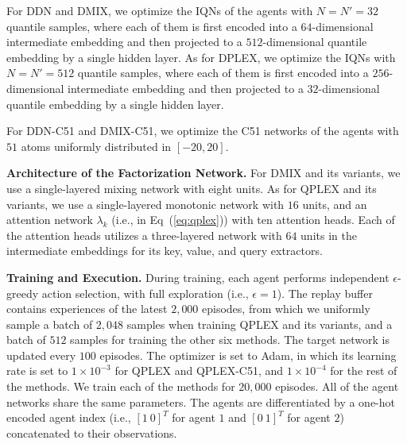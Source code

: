 \documentclass[twoside,11pt]{article}
\newcommand{\agentcounter}{k}
\newcommand{\numberofquantiles}{N}
\newcommand{\numberofquantilesamples}{N'}
\newcommand{\dmix}{DMIX}
\begin{document}
For DDN and DMIX, we optimize the IQNs of the agents with $\numberofquantiles{}=\numberofquantilesamples{}=32$ quantile samples, where each of them is first encoded into a $64$-dimensional intermediate embedding and then projected to a $512$-dimensional quantile embedding by a single hidden layer. As for DPLEX, we optimize the IQNs with $\numberofquantiles{}=\numberofquantilesamples{}=512$ quantile samples, where each of them is first encoded  into a $256$-dimensional intermediate embedding and then projected to a $32$-dimensional quantile embedding by a single hidden layer.

For DDN-C51 and DMIX-C51, we optimize the C51 networks of the agents with $51$ atoms uniformly distributed in $[-20,20]$.

\textbf{Architecture of the Factorization Network.}
For \dmix{} and its variants, we use a single-layered mixing network with eight units. As for QPLEX and its variants, we use a single-layered monotonic network with $16$ units, and an attention network $\lambda_\agentcounter{}$ (i.e., in Eq~(\ref{eq:qplex})) with ten attention heads. Each of the attention heads utilizes a three-layered network with $64$ units in the intermediate embeddings for its key, value, and query extractors.

\textbf{Training and Execution.}
During training, each agent performs independent $\epsilon$-greedy action selection, with full exploration (i.e., $\epsilon=1$). The replay buffer contains experiences of the latest $2,000$ episodes, from which we uniformly sample a batch of $2,048$ samples when training QPLEX and its variants, and a batch of $512$ samples for training the other six methods. The target network is updated every $100$ episodes. The optimizer is set to Adam, in which its learning rate is set to $1 \times 10^{-3}$ for QPLEX and QPLEX-C51, and $1 \times 10^{-4}$ for the rest of the methods. We train each of the methods for $20,000$ episodes. All of the agent networks share the same parameters. The agents are differentiated by a one-hot encoded agent index (i.e., $[1\ 0]^T$ for agent $1$ and $[0\ 1]^T$ for agent $2$) concatenated to their observations.
\end{document}
